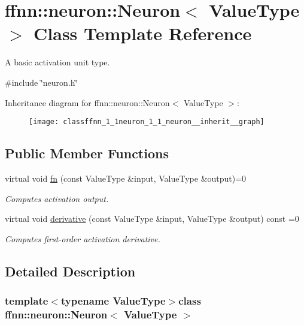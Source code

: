 \hypertarget{classffnn_1_1neuron_1_1_neuron}{\section{ffnn\-:\-:neuron\-:\-:Neuron$<$ Value\-Type $>$ Class Template Reference}
\label{classffnn_1_1neuron_1_1_neuron}
}


A basic activation unit type.  




{\ttfamily \#include \char`\"{}neuron.\-h\char`\"{}}



Inheritance diagram for ffnn\-:\-:neuron\-:\-:Neuron$<$ Value\-Type $>$\-:\nopagebreak
\begin{figure}[H]
\begin{center}
\leavevmode
\texttt{[image: classffnn\_1\_1neuron\_1\_1\_neuron\_\_inherit\_\_graph]}
\end{center}
\end{figure}
\subsection*{Public Member Functions}
\begin{DoxyCompactItemize}
\item 
virtual void \hyperlink{classffnn_1_1neuron_1_1_neuron_a4f03bb4fe57ffa74d70e447237b9b8fb}{fn} (const Value\-Type \&input, Value\-Type \&output)=0
\begin{DoxyCompactList}\small\item\em Computes activation output. \end{DoxyCompactList}\item 
virtual void \hyperlink{classffnn_1_1neuron_1_1_neuron_ac779b179887e6b4505dec96d0319af10}{derivative} (const Value\-Type \&input, Value\-Type \&output) const =0
\begin{DoxyCompactList}\small\item\em Computes first-\/order activation derivative. \end{DoxyCompactList}\end{DoxyCompactItemize}


\subsection{Detailed Description}
\subsubsection*{template$<$typename Value\-Type$>$class ffnn\-::neuron\-::\-Neuron$<$ Value\-Type $>$}


